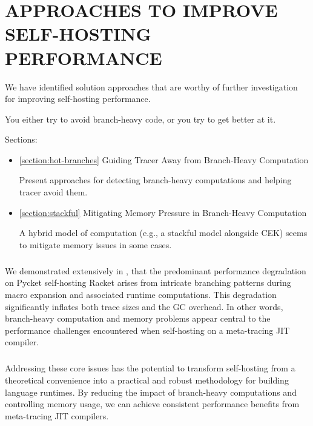 \chapter[\texorpdfstring{APPROACHES TO IMPROVE SELF-HOSTING PERFORMANCE}
                          {7. Improving Performance}]{APPROACHES TO IMPROVE SELF-HOSTING PERFORMANCE}

	\label{chapter:solution}

  \begin{chaptersynopsis}\footnotesize
    \footnotesize

    We have identified solution approaches that are worthy of further investigation for improving self-hosting performance.

    You either try to avoid branch-heavy code, or you try to get better at it.

    Sections:
		\begin{itemize}
			\item \ref{section:hot-branches} Guiding Tracer Away from Branch-Heavy Computation

				Present approaches for detecting branch-heavy computations and helping tracer avoid them.
			\item \ref{section:stackful} Mitigating Memory Pressure in Branch-Heavy Computation

				A hybrid model of computation (e.g., a stackful model alongside CEK) seems to mitigate memory issues in some cases.
		\end{itemize}
  \end{chaptersynopsis}

  \paragraph{}%
    We demonstrated extensively in , that the predominant performance degradation on Pycket self-hosting Racket arises from intricate branching patterns during macro expansion and associated runtime computations. This degradation significantly inflates both trace sizes and the GC overhead. In other words, branch-heavy computation and memory problems appear central to the performance challenges encountered when self-hosting on a meta-tracing JIT compiler.

  \paragraph{}%
    Addressing these core issues has the potential to transform self-hosting from a theoretical convenience into a practical and robust methodology for building language runtimes. By reducing the impact of branch-heavy computations and controlling memory usage, we can achieve consistent performance benefits from meta-tracing JIT compilers.

